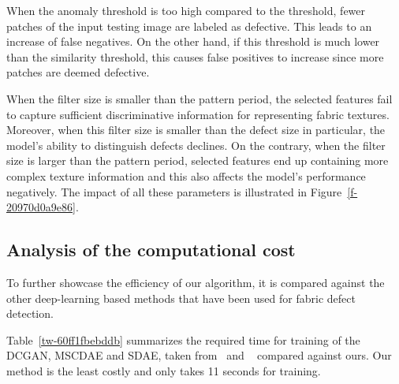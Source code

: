 \documentclass[3p,,preprint,review,12pt]{elsarticle}
\makeatletter
\def\fixFloatSize#1{}%
\makeatother
\begin{document}
When the anomaly threshold is too high compared to the threshold, fewer patches of the input testing image are labeled as defective. This leads to an increase of false negatives. On the other hand, if this threshold is much lower than the similarity threshold, this causes false positives to increase since more patches are deemed defective.


\bgroup
\fixFloatSize{Figures/Figure13.jpg}
\begin{figure*}[!htbp]
\centering \makeatletter{}
\makeatother 
\caption{{Illustration of the impact of the parameters: threshold, anomaly threshold and filter size. }}
\label{f-20970d0a9e86}
\end{figure*}
\egroup
When the filter size is smaller than the pattern period, the selected features fail to capture sufficient discriminative information for representing fabric textures. Moreover, when this filter size is smaller than the defect size in particular, the model's ability to distinguish defects declines. On the contrary, when the filter size is larger than the pattern period, selected features end up containing more complex texture information and this also affects the model's performance negatively. The impact of all these parameters is illustrated in Figure~\ref{f-20970d0a9e86}.



\subsection{Analysis of the computational cost}To further showcase the efficiency of our algorithm, it is compared against the other deep-learning based methods that have been used for fabric defect detection. 

Table~\ref{tw-60ff1fbebddb} summarizes the required time for training of the DCGAN, MSCDAE and SDAE, taken from\unskip~\cite{981091:21201204} and \unskip~\cite{981091:21201196} compared against ours. Our method is the least costly and only takes 11 seconds for training.  
\end{document}
